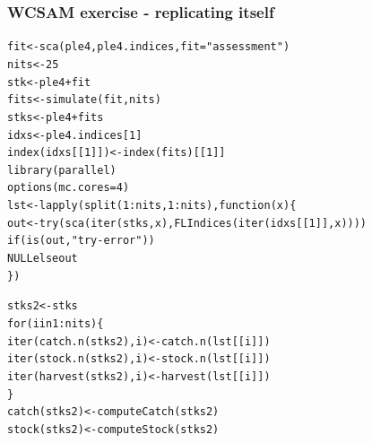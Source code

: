\documentclass[a4paper,english,10pt]{article}\usepackage[]{graphicx}\usepackage[]{color}
\makeatletter
\newcommand{\hlnum}[1]{\textcolor[rgb]{0.2,0.2,0.2}{#1}}%
\newcommand{\hlstr}[1]{\textcolor[rgb]{0.2,0.2,0.2}{#1}}%
\newcommand{\hlopt}[1]{\textcolor[rgb]{0.2,0.2,0.2}{#1}}%
\newcommand{\hlstd}[1]{\textcolor[rgb]{0,0,0}{#1}}%
\newcommand{\hlkwa}[1]{\textcolor[rgb]{0.361,0.506,0.596}{#1}}%
\newcommand{\hlkwb}[1]{\textcolor[rgb]{0.361,0.506,0.596}{#1}}%
\newcommand{\hlkwc}[1]{\textcolor[rgb]{0.361,0.506,0.596}{#1}}%
\newcommand{\hlkwd}[1]{\textcolor[rgb]{0.361,0.506,0.596}{#1}}%
\newenvironment{kframe}{%
 \def\at@end@of@kframe{}%
 \ifinner\ifhmode%
  \def\at@end@of@kframe{\end{minipage}}%
  \begin{minipage}{\columnwidth}%
 \fi\fi%
 \def\FrameCommand##1{\hskip\@totalleftmargin \hskip-\fboxsep
 \colorbox{shadecolor}{##1}\hskip-\fboxsep
     \hskip-\linewidth \hskip-\@totalleftmargin \hskip\columnwidth}%
 \MakeFramed {\advance\hsize-\width
   \@totalleftmargin\z@ \linewidth\hsize
   \@setminipage}}%
 {\par\unskip\endMakeFramed%
 \at@end@of@kframe}
\newenvironment{knitrout}{}{} %
\makeatother
\begin{document}


\subsubsection{WCSAM exercise - replicating itself}

\begin{knitrout}
\color{fgcolor}\begin{kframe}
\begin{alltt}
\hlstd{fit} \hlkwb{<-} \hlkwd{sca}\hlstd{(ple4, ple4.indices,} \hlkwc{fit} \hlstd{=} \hlstr{"assessment"}\hlstd{)}
\hlstd{nits} \hlkwb{<-} \hlnum{25}
\hlstd{stk} \hlkwb{<-} \hlstd{ple4} \hlopt{+} \hlstd{fit}
\hlstd{fits} \hlkwb{<-} \hlkwd{simulate}\hlstd{(fit, nits)}
\hlstd{stks} \hlkwb{<-} \hlstd{ple4} \hlopt{+} \hlstd{fits}
\hlstd{idxs} \hlkwb{<-} \hlstd{ple4.indices[}\hlnum{1}\hlstd{]}
\hlkwd{index}\hlstd{(idxs[[}\hlnum{1}\hlstd{]])} \hlkwb{<-} \hlkwd{index}\hlstd{(fits)[[}\hlnum{1}\hlstd{]]}
\hlkwd{library}\hlstd{(parallel)}
\hlkwd{options}\hlstd{(}\hlkwc{mc.cores} \hlstd{=} \hlnum{4}\hlstd{)}
\hlstd{lst} \hlkwb{<-} \hlkwd{lapply}\hlstd{(}\hlkwd{split}\hlstd{(}\hlnum{1}\hlopt{:}\hlstd{nits,} \hlnum{1}\hlopt{:}\hlstd{nits),} \hlkwa{function}\hlstd{(}\hlkwc{x}\hlstd{) \{}
    \hlstd{out} \hlkwb{<-} \hlkwd{try}\hlstd{(}\hlkwd{sca}\hlstd{(}\hlkwd{iter}\hlstd{(stks, x),} \hlkwd{FLIndices}\hlstd{(}\hlkwd{iter}\hlstd{(idxs[[}\hlnum{1}\hlstd{]], x))))}
    \hlkwa{if} \hlstd{(}\hlkwd{is}\hlstd{(out,} \hlstr{"try-error"}\hlstd{))}
        \hlkwa{NULL else} \hlstd{out}
\hlstd{\})}

\hlstd{stks2} \hlkwb{<-} \hlstd{stks}
\hlkwa{for} \hlstd{(i} \hlkwa{in} \hlnum{1}\hlopt{:}\hlstd{nits) \{}
    \hlkwd{iter}\hlstd{(}\hlkwd{catch.n}\hlstd{(stks2), i)} \hlkwb{<-} \hlkwd{catch.n}\hlstd{(lst[[i]])}
    \hlkwd{iter}\hlstd{(}\hlkwd{stock.n}\hlstd{(stks2), i)} \hlkwb{<-} \hlkwd{stock.n}\hlstd{(lst[[i]])}
    \hlkwd{iter}\hlstd{(}\hlkwd{harvest}\hlstd{(stks2), i)} \hlkwb{<-} \hlkwd{harvest}\hlstd{(lst[[i]])}
\hlstd{\}}
\hlkwd{catch}\hlstd{(stks2)} \hlkwb{<-} \hlkwd{computeCatch}\hlstd{(stks2)}
\hlkwd{stock}\hlstd{(stks2)} \hlkwb{<-} \hlkwd{computeStock}\hlstd{(stks2)}
\end{alltt}
\end{kframe}
\end{knitrout}
\end{document}
